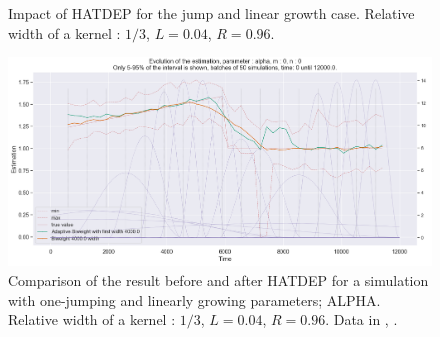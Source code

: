 \begin{figure}
\centering
{} 
\caption{Impact of HATDEP for the jump and linear growth case. Relative width of a kernel : $1/3$, $L = 0.04$, $R = 0.96$.}
\label{fig:compar_kernels_3}
\end{figure}

\begin{figure}
\centering
\includegraphics[width = 0.90 \textwidth]{../imag/chap3/3/J.png}
\caption{Comparison of the result before and after HATDEP for a simulation with one-jumping and linearly growing parameters; ALPHA. Relative width of a kernel : $1/3$, $L = 0.04$, $R = 0.96$. Data in \protect {}, \protect {}.}
\label{fig:first_estimate_3_alpha}
\end{figure}

